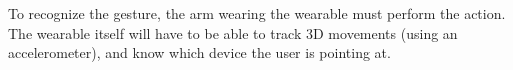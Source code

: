 To recognize the gesture, the arm wearing the wearable must perform the action. 
The wearable itself will have to be able to track 3D movements (using \eg an accelerometer), 
and know which device the user is pointing at. 

